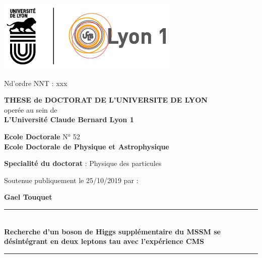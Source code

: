 \begin{titlepage}

\begin{center}
\includegraphics[scale= 0.5]{Images/Planche_UdL_LogoLyon1Sig_CoulRvb72dpi.jpg}
\end{center}

N\degree d'ordre NNT : xxx \\
\begin{center}
{\Large \textbf{THESE de DOCTORAT DE L'UNIVERSITE DE LYON}\\ }
operée au sein de \\ 
{ \textbf{L'Université Claude Bernard Lyon 1 }\\ }

\vspace{2em}
{ \textbf{Ecole Doctorale  } N° 52\\ }
{ \textbf{Ecole Doctorale de Physique et Astrophysique  } \\ }

\vspace{2em}
{ \textbf{Specialité du doctorat  } : Physique des particules\\ }
\vspace{4em}

 Soutenue publiquement le 25/10/2019 par : \\ 


\vspace{2em}

{\Large \textbf{Gael Touquet}}\\


\vspace{1em}

{\Large
\noindent\hfil\rule{0.7\textwidth}{1.5pt}\hfil\\
\vspace{.5em}
\textbf{Recherche d’un boson de Higgs supplémentaire du MSSM se désintégrant en deux leptons tau avec l’expérience CMS}\\
\noindent\hfil\rule{0.7\textwidth}{1.5pt}\hfil\\
}
\vspace{2em}




\end{center}
\end{titlepage}
